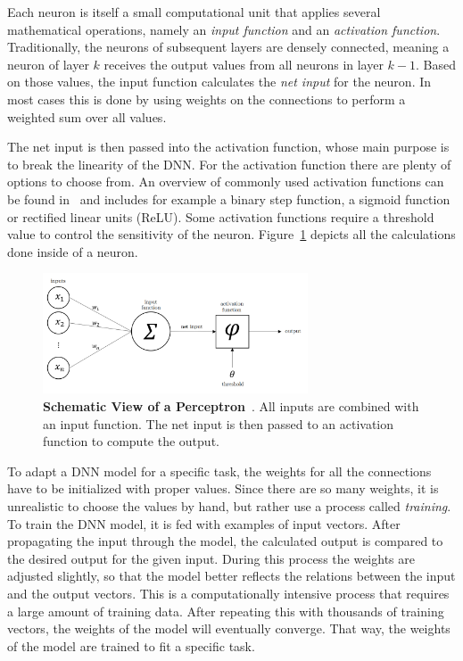 Each neuron is itself a small computational unit that applies several mathematical operations, namely an \emph{input function} and an \emph{activation function}. Traditionally, the neurons of subsequent layers are densely connected, meaning a neuron of layer $k$ receives the output values from all neurons in layer $k-1$. Based on those values, the input function calculates the \emph{net input} for the neuron. In most cases this is done by using weights on the connections to perform a weighted sum over all values.

The net input is then passed into the activation function, whose main purpose is to break the linearity of the DNN. For the activation function there are plenty of options to choose from. An overview of commonly used activation functions can be found in~\cite{act_funcs18} and includes for example a binary step function, a sigmoid function or rectified linear units (ReLU). Some activation functions require a threshold value to control the sensitivity of the neuron. Figure~\ref{fig:perceptron} depicts all the calculations done inside of a neuron.

\begin{figure}[h]
    \centering
    \includegraphics[width=0.7\textwidth]{images/perceptron}
    \caption[Schematic View of a Perceptron]
    {\textbf{Schematic View of a Perceptron}~\cite[p.~257, modified]{praxiseinstieg_ml17}. All inputs are combined with an input function. The net input is then passed to an activation function to compute the output.}
    \label{fig:perceptron}
\end{figure}

To adapt a DNN model for a specific task, the weights for all the connections have to be initialized with proper values. Since there are so many weights, it is unrealistic to choose the values by hand, but rather use a process called \emph{training}. To train the DNN model, it is fed with examples of input vectors. After propagating the input through the model, the calculated output is compared to the desired output for the given input. During this process the weights are adjusted slightly, so that the model better reflects the relations between the input and the output vectors. This is a computationally intensive process that requires a large amount of training data. After repeating this with thousands of training vectors, the weights of the model will eventually converge. That way, the weights of the model are trained to fit a specific task.


